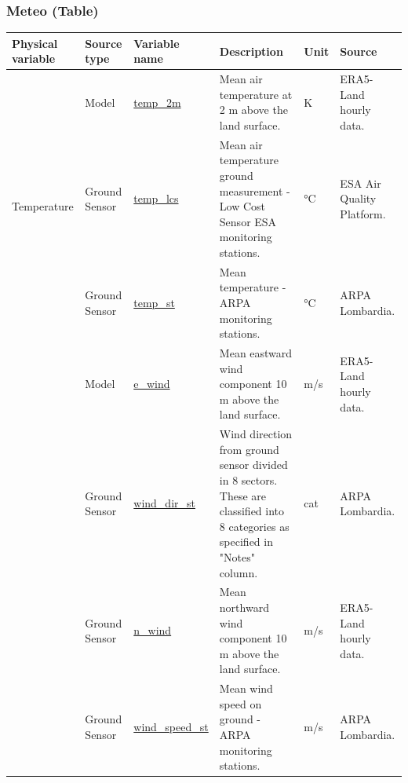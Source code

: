 \subsubsection{Meteo (Table)}
\begin{center}
\setlength{\arrayrulewidth}{1.5pt}

\begin{longtable}{ |p{2cm}|p{1.5cm}|p{2.3cm}|p{4cm}|p{1cm}|p{2cm}| } 
\hline
\textbf{Physical variable} & \textbf{Source type}  & \textbf{Variable name}  & \textbf{Description}  & \textbf{Unit}  & \textbf{Source}\\ 
\hline
\multirow{3}{4em}{Temperature} & Model  & \underline{temp\_2m} & Mean air temperature at 2 m above the land surface.\par & K & ERA5-Land hourly data.\\ 
& Ground \newline Sensor  & \underline{temp\_lcs} &  Mean air temperature ground measurement - Low Cost Sensor ESA monitoring stations.\par & °C & ESA Air Quality Platform.\\ 
& Ground \newline Sensor  & \underline{temp\_st} &  Mean temperature - ARPA monitoring stations.\par & °C & ARPA \newline Lombardia.\\ \hline
\pagebreak
\hline
\multirow{4}{4em}{Wind} & Model  & \underline{e\_wind} & Mean eastward wind component 10 m above the land surface.\par & m/s & ERA5-Land hourly data.\\ 
& Ground \newline Sensor  & \underline{wind\_dir\_st} &  Wind direction from ground sensor divided in 8 sectors. These are classified into 8 categories as specified in "Notes" column.\par & cat & ARPA \newline Lombardia.\\ 
& Ground \newline Sensor  & \underline{n\_wind} &  Mean northward wind component 10 m above the land surface.\par & m/s & ERA5-Land hourly data.\\
& Ground \newline Sensor  & \underline{wind\_speed\_st} &  Mean wind speed on ground  - ARPA monitoring stations. \par& m/s& ARPA \newline Lombardia.\\ \hline


\end{longtable}
\end{center}
